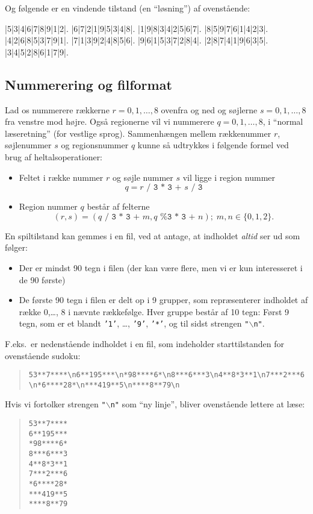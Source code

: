 \documentclass[a4paper,12pt]{article}
\begin{document}
Og f{\o}lgende er en vindende tilstand (en ``l{\o}sning'') af ovenst{\aa}ende:
\begin{sudoku}
|5|3|4|6|7|8|9|1|2|.
|6|7|2|1|9|5|3|4|8|.
|1|9|8|3|4|2|5|6|7|.
|8|5|9|7|6|1|4|2|3|.
|4|2|6|8|5|3|7|9|1|.
|7|1|3|9|2|4|8|5|6|.
|9|6|1|5|3|7|2|8|4|.
|2|8|7|4|1|9|6|3|5|.
|3|4|5|2|8|6|1|7|9|.
\end{sudoku}

\subsection*{Nummerering og filformat}
Lad os nummerere r{\ae}kkerne $r = 0, 1, \ldots, 8$ ovenfra og ned og s{\o}jlerne $s=0, 1, \ldots, 8$ fra venstre mod h{\o}jre.  Ogs{\aa} regionerne vil vi nummerere $q=0, 1, \ldots, 8$, i ``normal l{\ae}seretning'' (for vestlige sprog).  Sammenh{\ae}ngen mellem r{\ae}kkenummer $r$, s{\o}jlenummer $s$ og regionsnummer $q$ kunne s{\aa} udtrykkes i f{\o}lgende formel ved brug af heltalsoperationer: 
\begin{itemize}
\item Feltet i r{\ae}kke nummer $r$ og s{\o}jle nummer $s$ vil ligge i region nummer
  \begin{equation}
    q = \texttt{$r$ / 3 * 3 + $s$ / 3}
    \label{eq:1}
  \end{equation}
\item Region nummer $q$ best{\aa}r af felterne
  \begin{equation}
    (r,s)=\left(q\texttt{ / 3 * 3 + }m, q\texttt{ \% 3 * 3 + }n\right);\; m,n\in\{0,1,2\}.
    \label{eq:2}
  \end{equation}
\end{itemize}
En spiltilstand kan gemmes i en fil, ved at antage, at indholdet \emph{altid} ser ud som f{\o}lger:
\begin{itemize}
\item Der er mindst 90 tegn i filen (der kan v{\ae}re flere, men vi er kun interesseret i de 90 f{\o}rste)
\item De f{\o}rste 90 tegn i filen er delt op i 9 grupper, som repræsenterer indholdet af række 0,\dots, 8 i nævnte rækkefølge. Hver gruppe best{\aa}r af 10 tegn: F{\o}rst 9 tegn, som er et blandt \texttt{'1'}, \ldots, \texttt{'9'}, \texttt{'*'}, og til sidst strengen \texttt{"$\backslash$n"}.
\end{itemize}
F.eks.\ er nedenst{\aa}ende indholdet i en fil, som indeholder starttilstanden for ovenst{\aa}ende sudoku:
\begin{quote}
  {\scriptsize \verb|53**7****\n6**195***\n*98****6*\n8***6***3\n4**8*3**1\n7***2***6\n*6****28*\n***419**5\n****8**79\n|}
\end{quote}
Hvis vi fortolker strengen \texttt{"$\backslash$n"} som ``ny linje'', bliver ovenst{\aa}ende lettere at l{\ae}se:
\begin{quote}
\begin{verbatim}
53**7****
6**195***
*98****6*
8***6***3
4**8*3**1
7***2***6
*6****28*
***419**5
****8**79
\end{verbatim}
\end{quote}
\end{document}
